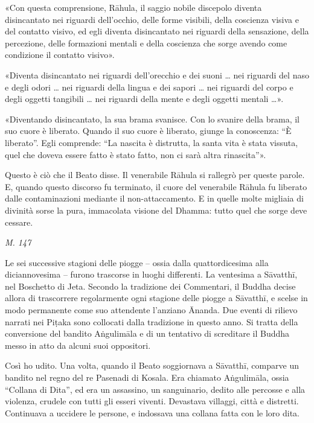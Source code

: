  «Con questa comprensione, Rāhula, il saggio nobile discepolo
diventa disincantato nei riguardi dell’occhio, delle forme visibili,
della coscienza visiva e del contatto visivo, ed egli diventa
disincantato nei riguardi della sensazione, della percezione, delle
formazioni mentali e della coscienza che sorge avendo come condizione il
contatto visivo».


«Diventa disincantato nei riguardi dell’orecchio e dei suoni … nei
riguardi del naso e degli odori … nei riguardi della lingua e dei sapori
… nei riguardi del corpo e degli oggetti tangibili … nei riguardi della
mente e degli oggetti mentali …».


«Diventando disincantato, la sua brama svanisce. Con lo svanire della
brama, il suo cuore è liberato. Quando il suo cuore è liberato, giunge
la conoscenza: “È liberato”. Egli comprende: “La nascita è distrutta, la
santa vita è stata vissuta, quel che doveva essere fatto è stato fatto,
non ci sarà altra rinascita”».


Questo è ciò che il Beato disse. Il venerabile Rāhula si rallegrò per
queste parole. E, quando questo discorso fu terminato, il cuore del
venerabile Rāhula fu liberato dalle contaminazioni mediante il
non-attaccamento. E in quelle molte migliaia di divinità sorse la pura,
immacolata visione del Dhamma: tutto quel che sorge deve cessare.


\emph{M. 147}


 Le sei successive stagioni delle piogge – ossia dalla
quattordicesima alla diciannovesima – furono trascorse in luoghi
differenti. La ventesima a Sāvatthī, nel Boschetto di Jeta. Secondo la
tradizione dei Commentari, il Buddha decise allora di trascorrere
regolarmente ogni stagione delle piogge a Sāvatthī, e scelse in modo
permanente come suo attendente l’anziano Ānanda. Due eventi di rilievo
narrati nei Piṭaka sono collocati dalla tradizione in questo anno. Si
tratta della conversione del bandito Aṅgulimāla e di un tentativo di
screditare il Buddha messo in atto da alcuni suoi oppositori.


 Così ho udito. Una volta, quando il Beato soggiornava a
Sāvatthī, comparve un bandito nel regno del re Pasenadi di Kosala. Era
chiamato Aṅgulimāla, ossia “Collana di Dita”, ed era un assassino, un
sanguinario, dedito alle percosse e alla violenza, crudele con tutti gli
esseri viventi. Devastava villaggi, città e distretti. Continuava a
uccidere le persone, e indossava una collana fatta con le loro dita.


